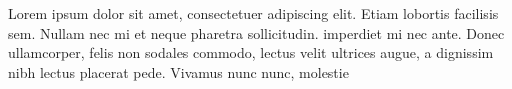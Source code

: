 \documentclass{memoir}
\begin{document}
\beginnumbering
\pstart
Lorem ipsum dolor sit amet, consectetuer adipiscing elit. Etiam
lobortis facilisis sem. Nullam nec mi et neque pharetra
sollicitudin.  imperdiet mi nec ante. Donec ullamcorper,
felis non sodales commodo, lectus velit ultrices augue, a
dignissim nibh lectus placerat pede. Vivamus nunc nunc, molestie
\pend
\endnumbering
\printglossary
\end{document}
